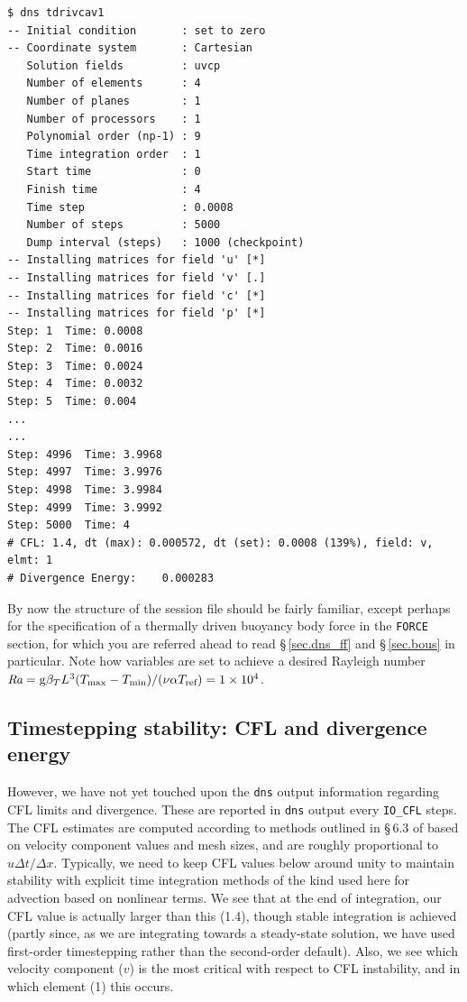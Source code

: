 \documentclass[11pt]{report}
\def\Ra{\mbox{\it Ra}}                              %
\newcommand\cg{\mathrm{g}}
\begin{document}
%
{\small
\begin{verbatim}
$ dns tdrivcav1
-- Initial condition       : set to zero
-- Coordinate system       : Cartesian
   Solution fields         : uvcp
   Number of elements      : 4
   Number of planes        : 1
   Number of processors    : 1
   Polynomial order (np-1) : 9
   Time integration order  : 1
   Start time              : 0
   Finish time             : 4
   Time step               : 0.0008
   Number of steps         : 5000
   Dump interval (steps)   : 1000 (checkpoint)
-- Installing matrices for field 'u' [*]
-- Installing matrices for field 'v' [.]
-- Installing matrices for field 'c' [*]
-- Installing matrices for field 'p' [*]
Step: 1  Time: 0.0008
Step: 2  Time: 0.0016
Step: 3  Time: 0.0024
Step: 4  Time: 0.0032
Step: 5  Time: 0.004
...
...
Step: 4996  Time: 3.9968
Step: 4997  Time: 3.9976
Step: 4998  Time: 3.9984
Step: 4999  Time: 3.9992
Step: 5000  Time: 4
# CFL: 1.4, dt (max): 0.000572, dt (set): 0.0008 (139%), field: v, elmt: 1
# Divergence Energy:    0.000283
\end{verbatim}
}

By now the structure of the session file should be fairly familiar,
except perhaps for the specification of a thermally driven buoyancy
body force in the \verb|FORCE| section, for which you are referred
ahead to read \S\,\ref{sec.dns_ff} and \S\,\ref{sec.bous} in
particular.  Note how variables are set to achieve a desired Rayleigh
number
$\Ra=\cg\beta_TL^3
(T_\textrm{max}-T_\textrm{min})/(\nu\alpha T_\textrm{ref})=1\times10^4$.

\subsection{Timestepping stability: CFL and divergence energy}
\label{sec.cfl}

However, we have not yet touched upon the \verb|dns| output
information regarding CFL limits and divergence.  These are reported
in \verb|dns| output every \verb|IO_CFL| steps.  The CFL estimates are
computed according to methods outlined in \S\,6.3 of \citet{kars05}
based on velocity component values and mesh sizes, and are roughly
proportional to $u\Delta t/\Delta x$.  Typically, we need to keep CFL
values below around unity to maintain stability with explicit time
integration methods of the kind used here for advection based on
nonlinear terms.  We see that at the end of integration, our CFL value
is actually larger than this (1.4), though stable integration is
achieved (partly since, as we are integrating towards a steady-state
solution, we have used first-order timestepping rather than the
second-order default).  Also, we see which velocity component ($v$) is
the most critical with respect to CFL instability, and in which
element (1) this occurs.
\end{document}

